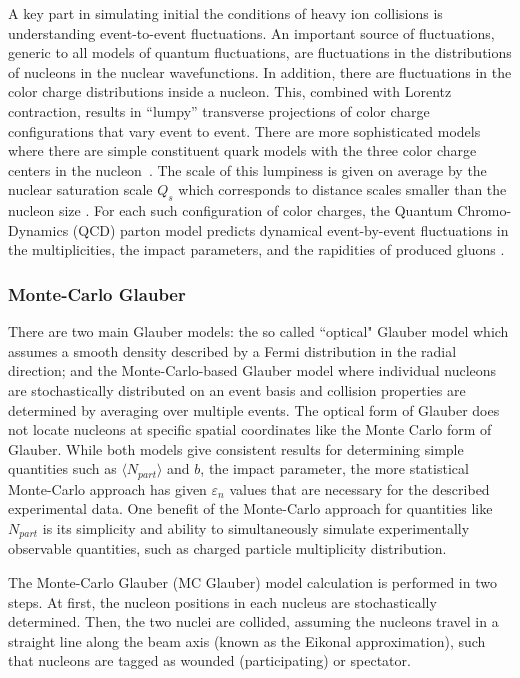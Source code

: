A key part in simulating initial the conditions of heavy ion collisions is understanding event-to-event fluctuations.  An important source of fluctuations, generic to all models of quantum fluctuations, are fluctuations in the distributions of nucleons in the nuclear wavefunctions. In addition, there are fluctuations in the color charge distributions inside a nucleon. This, combined with Lorentz contraction, results in “lumpy” transverse projections of color charge configurations that vary event to event. There are more sophisticated models where there are simple constituent quark models with the three color charge centers in the nucleon~\cite{PhysRevC.94.024919}. The scale of this lumpiness is given on average by the nuclear saturation scale $Q_s$ which corresponds to distance scales smaller than the nucleon size . For each such configuration of color charges, the Quantum Chromo-Dynamics (QCD) parton model predicts dynamical event-by-event fluctuations in the multiplicities, the impact parameters, and the rapidities of produced gluons \cite{PhysRevLett.108.252301}.

\subsubsection{Monte-Carlo Glauber}%
\label{sec:ch2_mc_glaub}
There are two main Glauber models: the so called ``optical" Glauber model which assumes a smooth density described by a Fermi distribution in the radial direction; and the Monte-Carlo-based Glauber model where individual nucleons are stochastically distributed on an event basis and collision properties are determined by averaging over multiple events. The optical form of Glauber does not locate nucleons at specific spatial coordinates like the Monte Carlo form of Glauber. While both models give consistent results for determining simple quantities such as $\langle N_{part}\rangle$ and $b$, the impact parameter, the more statistical Monte-Carlo approach has given $\varepsilon_n$ values that are necessary for the described experimental data. One benefit of the Monte-Carlo approach for quantities like $N_{part}$ is its simplicity and ability to simultaneously simulate experimentally observable quantities, such as charged particle multiplicity distribution.

The Monte-Carlo Glauber (MC Glauber) model calculation is performed in two steps. At first, the nucleon positions in each nucleus are stochastically determined. Then, the two nuclei are collided, assuming the nucleons travel in a straight line along the beam axis (known as the Eikonal approximation), such that nucleons are tagged as wounded (participating) or spectator.

